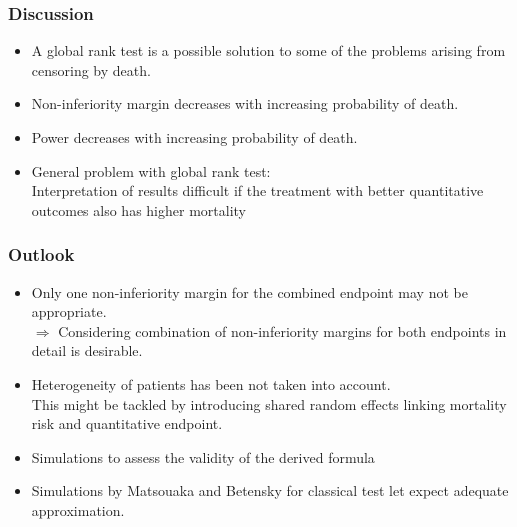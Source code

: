 \documentclass[xcolor=pdftex,dvipsnames,table]{beamer}\usepackage[]{graphicx}\usepackage[]{color}
\begin{document}
\begin{frame} %
\frametitle{Discussion}
\begin{itemize}
\item A global rank test is a possible solution to some of the problems arising from censoring by death.
\item Non-inferiority margin decreases with increasing probability of death.
\item Power decreases with increasing probability of death.
\item General problem with global rank test: \\
      Interpretation of results difficult if the treatment with better quantitative outcomes also has higher mortality \\
\end{itemize}
\end{frame}

\begin{frame} %
\frametitle{Outlook}
\begin{itemize}
\item Only one non-inferiority margin for the combined endpoint may not be appropriate. \\
$\Rightarrow$  Considering combination of non-inferiority margins for both endpoints in detail is desirable.
\item Heterogeneity of patients has been not taken into account. \\
      This might be tackled by introducing shared random effects linking mortality risk and quantitative endpoint.
\item Simulations to assess the validity of the derived formula
\item Simulations by Matsouaka and Betensky for classical test let expect adequate approximation.
\end{itemize}
\end{frame}
\end{document}
